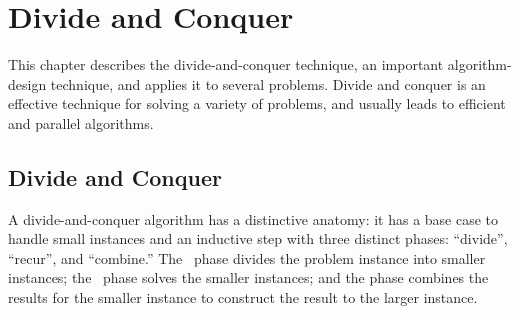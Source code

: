 \chapter{Divide and Conquer}
\label{ch:design::dc}

\begin{cluster}
\label{grp:prmbl:design::dc::describes}

\begin{preamble}
\label{prmbl:design::dc::describes}
This chapter describes the divide-and-conquer technique, an important algorithm-design technique, and applies it to several problems.
Divide and conquer is an effective technique for solving a variety of problems, and usually leads to efficient and parallel algorithms.

\end{preamble}
\end{cluster}


\section{Divide and Conquer}
\label{sec:design::dc}

\begin{cluster}
\label{grp:grm:design::dc::divide-and-conquer}

\begin{gram}
\label{grm:design::dc::divide-and-conquer}
A divide-and-conquer algorithm has a distinctive anatomy: it has a base case to handle small instances and an inductive step with three
distinct phases: ``divide'', ``recur'', and ``combine.''
The ~phase divides the problem instance into smaller instances;
the ~phase solves the smaller instances;
and the  phase combines the results for the smaller
instance to construct the result to the larger instance.

\end{gram}
\end{cluster}

